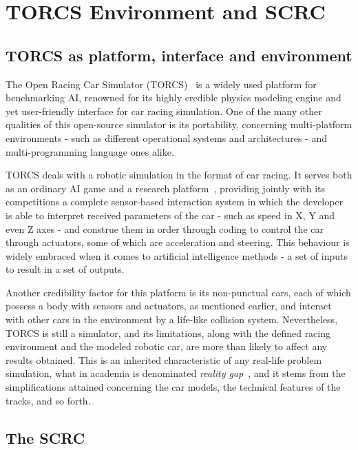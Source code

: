 \section{\textbf{TORCS Environment and SCRC}} \label{sec:torcs}

\subsection{TORCS as platform, interface and environment}

	The Open Racing Car Simulator (TORCS)~\cite{TORCS} is a widely used platform for benchmarking AI, renowned for
	its	highly credible physics modeling engine and yet user-friendly interface for car racing simulation. One of
	the	many other qualities of this open-source simulator is its portability, concerning multi-platform environments
	- such as different operational systems and architectures - and multi-programming language ones alike.
	
	TORCS deals with a robotic simulation in the format of car racing. It serves both as an ordinary AI game and a
	research platform~\cite{2009}, providing jointly with its competitions a complete sensor-based interaction system
	in which the developer is able to interpret received parameters of the car - such as speed in X, Y and even Z
	axes - and construe them in order through coding to control the car through actuators, some of which are
	acceleration and steering. This behaviour is widely embraced when it comes to artificial intelligence methods - a
	set of inputs to result in a set of outputs.
	
	Another credibility factor for this platform is its non-punctual cars, each of which possess a body with sensors
	and actuators, as mentioned earlier, and interact with other cars in the environment by a life-like collision
	system. Nevertheless, TORCS is still a simulator, and its limitations, along with the defined racing environment
	and the modeled robotic car, are more than likely to affect any results obtained. This is an inherited
	characteristic of any real-life problem simulation, what in academia is denominated \emph{reality gap}~\cite{RG}, and it stems from the simplifications attained concerning the car models, the technical features of the tracks,
	and so forth.

\subsection{The SCRC}

